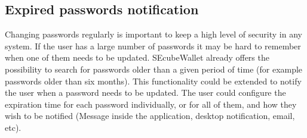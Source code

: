 \subsection{Expired passwords notification}

Changing passwords regularly is important to keep a high level of security in any system. If the user has a large number of passwords it may be hard to remember when one of them needs to be updated. SEcubeWallet already offers the possibility to search for passwords older than a given period of time (for example passwords older than six months). This functionality could be extended to notify the user when a password needs to be updated. The user could configure the expiration time for each password individually, or for all of them, and how they wish to be notified (Message inside the application, desktop notification, email, etc).